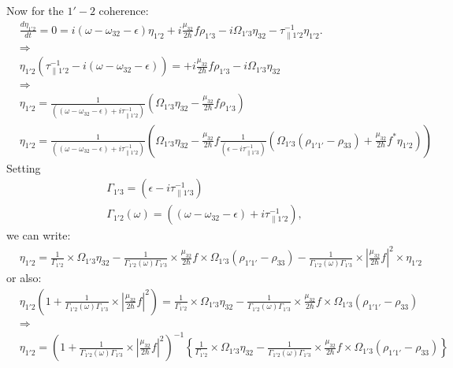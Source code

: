 \documentclass[10pt,letterpaper]{article}
\begin{document}
	\noindent
	Now for the $1'-2$ coherence:
	\begin{align}
	&\frac{d \eta_{1'2}}{d t}  = 0 = i(\omega - \omega_{32}-\epsilon)\eta_{1'2} +i \frac{\mu_{32}}{2\hbar}f\rho_{1'3} - i\Omega_{1'3}\eta_{32} - \tau_{\parallel 1'2}^{-1}\eta_{1'2}. \\
	&\Rightarrow \nonumber \\
	&\eta_{1'2}(\tau_{\parallel 1'2}^{-1} -i(\omega - \omega_{32}-\epsilon)) =  +i \frac{\mu_{32}}{2\hbar}f\rho_{1'3} - i\Omega_{1'3}\eta_{32}  \\
	&\Rightarrow \nonumber \\
	&\eta_{1'2}=  \frac{1}{((\omega - \omega_{32}-\epsilon)+i\tau_{\parallel 1'2}^{-1} ) } \left(\Omega_{1'3}\eta_{32} - \frac{\mu_{32}}{2\hbar}f\rho_{1'3} \right)  \\
	&\eta_{1'2}=  \frac{1}{((\omega - \omega_{32}-\epsilon)+i\tau_{\parallel 1'2}^{-1} ) } \left(\Omega_{1'3}\eta_{32} - \frac{\mu_{32}}{2\hbar}f\frac{1}{(\epsilon-i\tau_{\parallel 1'3}^{-1})} \left( \Omega_{1'3}(\rho_{1'1'} - \rho_{33}) +\frac{\mu_{32}}{2 \hbar}f^*\eta_{1'2} \right) \right)
	\end{align}
	Setting
	\begin{align}
	\Gamma_{1'3} = (\epsilon-i\tau_{\parallel 1'3}^{-1}) \\
	\Gamma_{1'2}(\omega) = ((\omega - \omega_{32}-\epsilon)+i\tau_{\parallel 1'2}^{-1} ),
	\end{align}
	we can write:
	\begin{align}
	&\eta_{1'2}=  \frac{1}{ \Gamma_{1'2} } \times \Omega_{1'3}\eta_{32} - \frac{1}{\Gamma_{1'2}(\omega)\Gamma_{1'3}}\times \frac{\mu_{32}}{2 \hbar}f\times \Omega_{1'3}(\rho_{1'1'} - \rho_{33})- \frac{1}{\Gamma_{1'2}(\omega)\Gamma_{1'3}}\times|\frac{\mu_{32}}{2 \hbar}f|^2\times\eta_{1'2}
	\end{align}
	or also:
	\begin{align}
	&\eta_{1'2}\left(1+\frac{1}{\Gamma_{1'2}(\omega)\Gamma_{1'3}}\times|\frac{\mu_{32}}{2 \hbar}f|^2 \right)=  \frac{1}{ \Gamma_{1'2} } \times \Omega_{1'3}\eta_{32} - \frac{1}{\Gamma_{1'2}(\omega)\Gamma_{1'3}}\times \frac{\mu_{32}}{2 \hbar}f\times \Omega_{1'3}(\rho_{1'1'} - \rho_{33}) \\ 
	&\Rightarrow \\
	&\eta_{1'2}= \left(1+\frac{1}{\Gamma_{1'2}(\omega)\Gamma_{1'3}}\times|\frac{\mu_{32}}{2 \hbar}f|^2 \right)^{-1} \left\{ \frac{1}{ \Gamma_{1'2} } \times \Omega_{1'3}\eta_{32} - \frac{1}{\Gamma_{1'2}(\omega)\Gamma_{1'3}}\times \frac{\mu_{32}}{2 \hbar}f\times \Omega_{1'3}(\rho_{1'1'} - \rho_{33})\right\} 
	\end{align}
\end{document}
